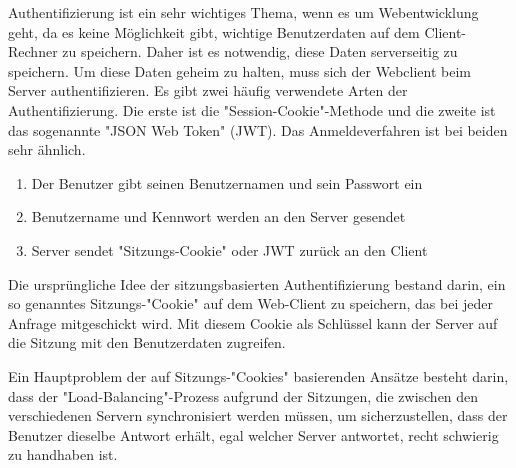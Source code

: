 
Authentifizierung ist ein sehr wichtiges Thema, wenn es um Webentwicklung geht, da es keine Möglichkeit gibt, wichtige Benutzerdaten auf dem Client-Rechner zu speichern. Daher ist es notwendig, diese Daten serverseitig zu speichern. Um diese Daten geheim zu halten, muss sich der Webclient beim Server authentifizieren. Es gibt zwei häufig verwendete Arten der Authentifizierung. Die erste ist die "Session-Cookie"-Methode und die zweite ist das sogenannte "JSON Web Token" (JWT). Das Anmeldeverfahren ist bei beiden sehr ähnlich. 

\begin{enumerate}
    \item Der Benutzer gibt seinen Benutzernamen und sein Passwort ein
    \item Benutzername und Kennwort werden an den Server gesendet
    \item Server sendet "Sitzungs-Cookie" oder JWT zurück an den Client
\end{enumerate}


Die ursprüngliche Idee der sitzungsbasierten Authentifizierung bestand darin, ein so genanntes Sitzungs-"Cookie" auf dem Web-Client zu speichern, das bei jeder Anfrage mitgeschickt wird. Mit diesem Cookie als Schlüssel kann der Server auf die Sitzung mit den Benutzerdaten zugreifen. 

Ein Hauptproblem der auf Sitzungs-"Cookies" basierenden Ansätze besteht darin, dass der "Load-Balancing"-Prozess aufgrund der Sitzungen, die zwischen den verschiedenen Servern synchronisiert werden müssen, um sicherzustellen, dass der Benutzer dieselbe Antwort erhält, egal welcher Server antwortet, recht schwierig zu handhaben ist.

